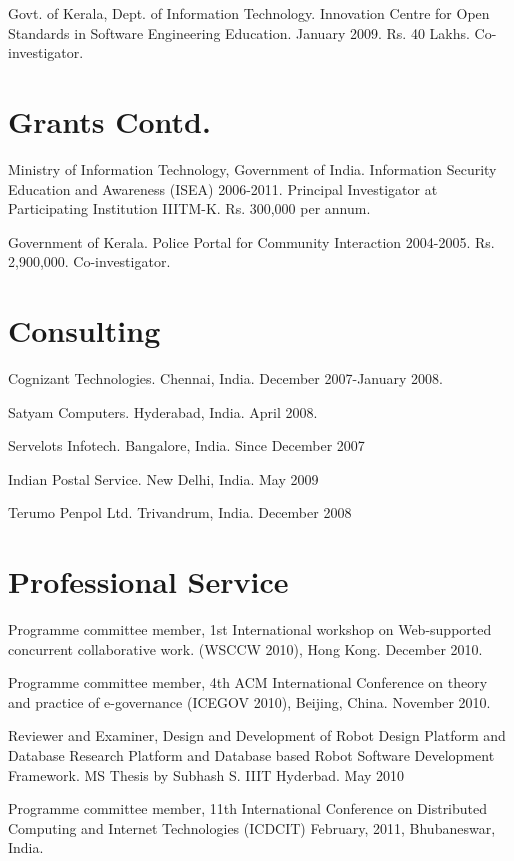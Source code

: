 \documentclass[11pt,margin,line]{res}
\begin{document}
\begin{resume}
Govt. of Kerala, Dept. of Information Technology.
Innovation Centre for Open Standards in Software Engineering
Education.  January 2009.  Rs. 40 Lakhs.  Co-investigator.

\newpage

\section{\sc Grants Contd.}
Ministry of Information Technology, Government of India.
Information Security Education and Awareness (ISEA)
2006-2011.  Principal Investigator at Participating
Institution IIITM-K.  Rs. 300,000 per annum. 

Government of Kerala.  Police Portal for Community
Interaction 2004-2005.  Rs. 2,900,000.  Co-investigator.

\section{\sc Consulting}

Cognizant Technologies.  Chennai, India.  December
2007-January 2008.

Satyam Computers.  Hyderabad, India.  April 2008.

Servelots Infotech.  Bangalore, India.  Since December 2007

Indian Postal Service.   New Delhi, India.  May 2009

Terumo Penpol Ltd.  Trivandrum, India.  December 2008

\vspace{2em}

\section{\sc Professional Service}

Programme committee member, 1st International workshop on
Web-supported concurrent collaborative work.  (WSCCW 2010),
Hong Kong.  December 2010.

Programme committee member, 4th ACM International Conference
on theory and practice of e-governance (ICEGOV 2010),
Beijing, China.  November 2010.

Reviewer and Examiner, Design and Development of Robot
Design Platform and Database Research Platform and Database
based Robot Software Development Framework.  MS Thesis by
Subhash S. IIIT Hyderbad.  May 2010

Programme committee member, 11th International Conference on
Distributed Computing and Internet Technologies (ICDCIT)
February, 2011, Bhubaneswar, India.


\end{resume}
\end{document}
